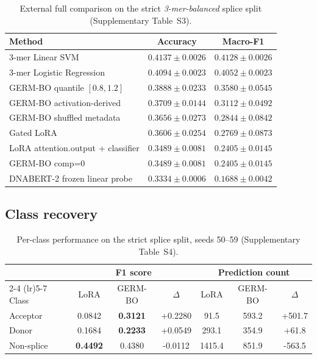 \documentclass[11pt,a4paper]{article}
\newcommand{\splitname}[1]{\textit{#1}}
\begin{document}
\begin{table}[htbp]
\centering
\caption{External full comparison on the strict \splitname{3-mer-balanced} splice split (Supplementary Table~S3).}
\label{tab:external-ablation}
\small
\begin{tabular}{lcc}
\toprule
Method & Accuracy & Macro-F1 \\
\midrule
3-mer Linear SVM & $\mathbf{0.4137 \pm 0.0026}$ & $\mathbf{0.4128 \pm 0.0026}$ \\
3-mer Logistic Regression & $0.4094 \pm 0.0023$ & $0.4052 \pm 0.0023$ \\
GERM-BO quantile $[0.8,1.2]$ & $\mathbf{0.3888 \pm 0.0233}$ & $\mathbf{0.3580 \pm 0.0545}$ \\
GERM-BO activation-derived & $0.3709 \pm 0.0144$ & $0.3112 \pm 0.0492$ \\
GERM-BO shuffled metadata & $0.3656 \pm 0.0273$ & $0.2844 \pm 0.0842$ \\
Gated LoRA & $0.3606 \pm 0.0254$ & $0.2769 \pm 0.0873$ \\
LoRA attention.output + classifier & $0.3489 \pm 0.0081$ & $0.2405 \pm 0.0145$ \\
GERM-BO comp=0 & $0.3489 \pm 0.0081$ & $0.2405 \pm 0.0145$ \\
DNABERT-2 frozen linear probe & $0.3334 \pm 0.0006$ & $0.1688 \pm 0.0042$ \\
\bottomrule
\end{tabular}
\end{table}

\subsection{Class recovery}

\begin{table}[htbp]
\centering
\caption{Per-class performance on the strict splice split, seeds 50--59 (Supplementary Table~S4).}
\label{tab:class-recovery}
\small
\begin{tabular}{lcccccc}
\toprule
& \multicolumn{3}{c}{F1 score} & \multicolumn{3}{c}{Prediction count} \\
\cmidrule(lr){2-4} \cmidrule(lr){5-7}
Class & LoRA & GERM-BO & $\Delta$ & LoRA & GERM-BO & $\Delta$ \\
\midrule
Acceptor    & 0.0842 & \textbf{0.3121} & +0.2280 & 91.5   & 593.2  & +501.7 \\
Donor       & 0.1684 & \textbf{0.2233} & +0.0549 & 293.1  & 354.9  & +61.8  \\
Non-splice  & \textbf{0.4492} & 0.4380 & -0.0112 & 1415.4 & 851.9  & -563.5 \\
\bottomrule
\end{tabular}
\end{table}
\end{document}
